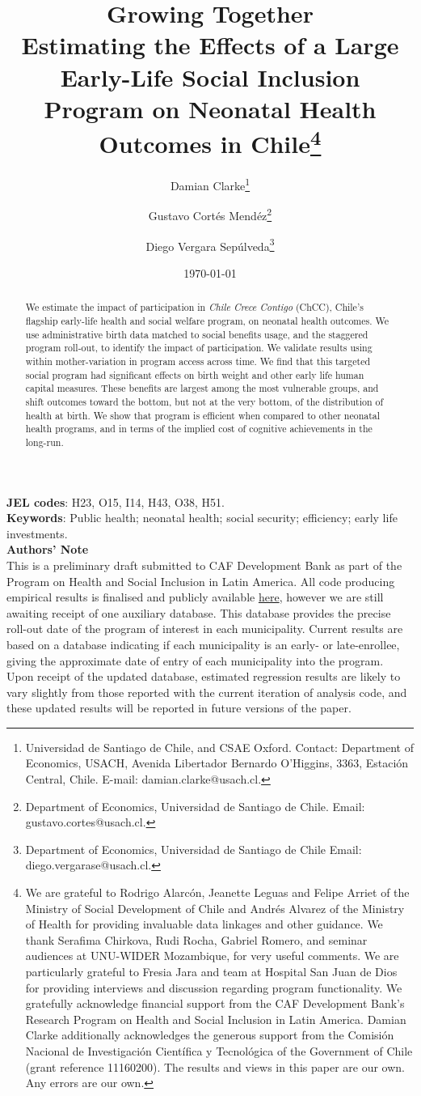 \documentclass[12pt]{article}
\title{\textbf{Growing Together} \\
  Estimating the Effects of a Large Early-Life Social Inclusion Program on
  Neonatal Health Outcomes in Chile\thanks{We
         are grateful to Rodrigo Alarc\'on, Jeanette Leguas and Felipe Arriet of
         the Ministry of Social Development of Chile and Andr\'es Alvarez of the
         Ministry of Health for providing invaluable data linkages and other
         guidance.  We thank Serafima Chirkova, Rudi Rocha, Gabriel Romero, and
         seminar audiences at UNU-WIDER Mozambique, %
         for very useful comments.  We are
         particularly grateful to Fresia Jara and team at Hospital San Juan de
         Dios for providing interviews and discussion regarding program
         functionality.  We gratefully acknowledge financial
         support from the CAF Development Bank's Research Program on Health and
         Social Inclusion in Latin America.  Damian Clarke additionally
         acknowledges the generous support from the Comisi\'on Nacional de
         Investigaci\'on Cient\'ifica y Tecnol\'ogica of the Government of Chile
         (grant reference 11160200).  The results and views in this paper are
         our own. Any errors are our own.}}
\author{Damian Clarke\thanks{Universidad de Santiago
    de Chile, and CSAE Oxford. Contact: Department of Economics, USACH, Avenida Libertador
    Bernardo O'Higgins, 3363, Estaci\'on Central, Chile. E-mail: damian.clarke@usach.cl.}
  \and Gustavo Cort\'es Mend\'ez\thanks{Department of Economics, Universidad de Santiago
    de Chile. Email: gustavo.cortes@usach.cl.}
\and Diego Vergara Sep\'ulveda\thanks{Department of Economics, Universidad de Santiago
    de Chile Email: diego.vergarase@usach.cl.}}
\date{\today}
\begin{document}
\maketitle
\vspace{-1.5cm}
\begin{center}
\end{center}
\begin{spacing}{1.4}
\begin{abstract}
  We estimate the impact of participation in \emph{Chile Crece Contigo} (ChCC),
  Chile's flagship early-life health and social welfare program, on neonatal
  health outcomes. We use administrative birth data matched to social benefits
  usage, and the staggered program roll-out, to identify the impact of
  participation.  We validate results using within mother-variation in program
  access across time.  We find that this targeted social program had significant
  effects on birth weight and other early life human capital measures.  These
  benefits are largest among the most vulnerable groups, and shift outcomes
  toward the bottom, but not at the very bottom, of the distribution of health
  at birth.  We show that program is efficient when compared to other neonatal
  health programs, and in terms of the implied cost of cognitive achievements
  in the long-run.
\end{abstract}
\noindent \textbf{JEL codes}: H23, O15, I14, H43, O38, H51. \\
\noindent \hspace{1mm} \textbf{Keywords}: Public health; neonatal health; social
security; efficiency; early life investments. \\

\clearpage
\noindent \textbf{Authors' Note} \\
This is a preliminary draft submitted to CAF Development Bank as part of the
Program on Health and Social Inclusion in Latin America.  All code producing
empirical results is finalised and publicly available
\href{https://github.com/damiancclarke/ChCC-neonate/tree/master/source}{here},
however we are still awaiting receipt of one auxiliary database. This database
provides the precise roll-out date of the program of interest in each
municipality.  Current results are based on a database indicating if each
municipality is an early- or late-enrollee, giving the approximate date of
entry of each municipality into the program.  Upon receipt of the updated
database, estimated regression results are likely to vary slightly from those
reported with the current iteration of analysis code, and these updated
results will be reported in future versions of the paper.



\end{spacing}
\end{document}
